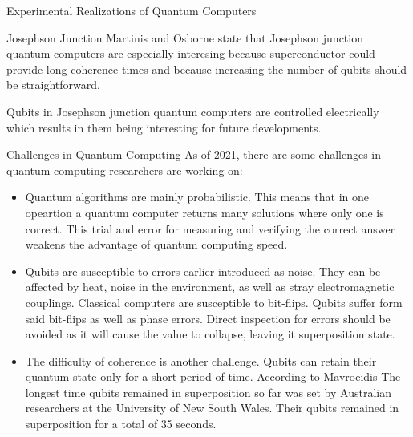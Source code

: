\documentclass[aps,preprintnumbers,twocolumn]{revtex4}
\begin{document}
\begin{section}{Experimental Realizations of Quantum Computers}
\begin{subsection}{Josephson Junction}
Martinis and Osborne state \cite{martinis} that Josephson junction quantum computers are especially interesing because superconductor could provide long coherence times and because increasing the number of qubits should be straightforward. 

Qubits in Josephson junction quantum computers are controlled electrically which results in them being interesting for future developments.
\end{subsection}

\begin{section}{Challenges in Quantum Computing}
As of 2021, there are some challenges in quantum computing researchers are working on: 

\begin{itemize}
    \item Quantum algorithms are mainly probabilistic. 
    This means that in one opeartion a quantum computer returns many solutions where only one is correct. 
    This trial and error for measuring and verifying the correct answer weakens the advantage of quantum computing speed. 
    \item Qubits are susceptible to errors earlier introduced as noise. 
    They can be affected by heat, noise in the environment, 
    as well as stray electromagnetic couplings. 
    Classical computers are susceptible to bit-flips. Qubits suffer form said bit-flips as well as phase errors. 
    Direct inspection for errors should be avoided as it will cause the value to collapse, leaving it superposition state.
    \item The difficulty of coherence is another challenge. 
    Qubits can retain their quantum state only for a short period of time. 
    According to Mavroeidis \cite{DBLP:journals/corr/abs-1804-00200} The longest time qubits remained in superposition so far was set by Australian researchers at the University of New South Wales. 
    Their qubits remained in superposition for a total of 35 seconds.
\end{itemize}

\end{section}

\end{section}
\end{document}
